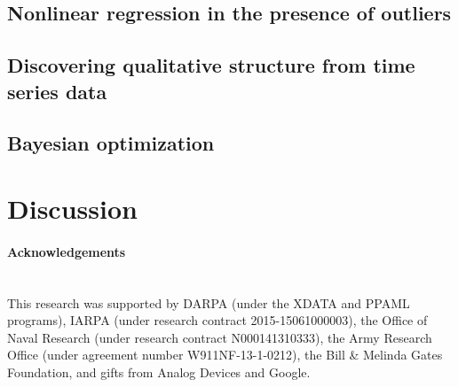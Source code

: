 \documentclass[twoside,11pt]{article}
\newcommand{\gpmem}{\texttt{gpmem}}
\newcommand{\myparagraph}[1]{\paragraph{#1}\mbox{}\\}
\begin{document}
\subsection{Nonlinear regression in the presence of outliers}

%
\subsection{Discovering qualitative structure from time series data}\label{sec:structurelearning}


\subsection{Bayesian optimization}

\label{sec:thompson}




%
%
%
\section{Discussion}

\myparagraph{Acknowledgements}
This research was supported by DARPA
  (under the XDATA and PPAML programs), IARPA (under research contract
  2015-15061000003), the Office of Naval Research (under research
  contract N000141310333), the Army Research Office (under agreement
  number W911NF-13-1-0212), the Bill \& Melinda Gates Foundation, and
  gifts from Analog Devices and Google.
\newpage
\end{document}
